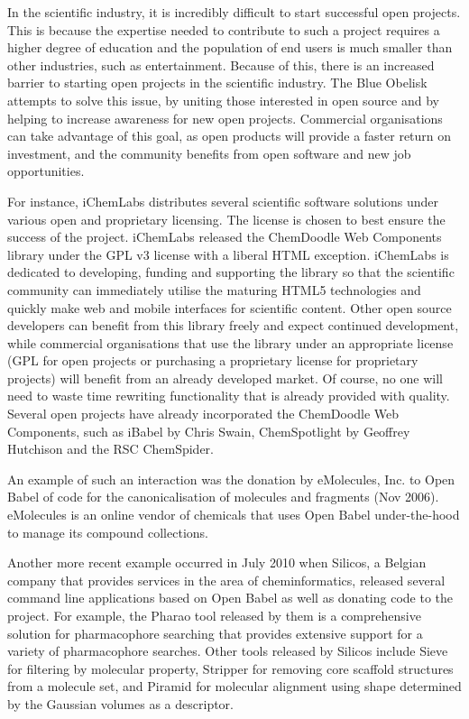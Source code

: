 \documentclass[10pt]{bmc_article}
\newenvironment{bmcformat}{\fussy\setboolean{publ}{true}}{\fussy}
\begin{document}
\begin{bmcformat}
In the scientific industry, it is incredibly difficult to start successful open projects. This is because the expertise needed to contribute to such a project requires a higher degree of education and the population of end users is much smaller than other industries, such as entertainment. Because of this, there is an increased barrier to starting open projects in the scientific industry. The Blue Obelisk attempts to solve this issue, by uniting those interested in open source and by helping to increase awareness for new open projects. Commercial organisations can take advantage of this goal, as open products will provide a faster return on investment, and the community benefits from open software and new job opportunities.

For instance, iChemLabs distributes several scientific software solutions under various open and proprietary licensing. The license is chosen to best ensure the success of the project. iChemLabs released the ChemDoodle Web Components library under the GPL v3 license with a liberal HTML exception. iChemLabs is dedicated to developing, funding and supporting the library so that the scientific community can immediately utilise the maturing HTML5 technologies and quickly make web and mobile interfaces for scientific content. Other open source developers can benefit from this library freely and expect continued development, while commercial organisations that use the library under an appropriate license (GPL for open projects or purchasing a proprietary license for proprietary projects) will benefit from an already developed market. Of course, no one will need to waste time rewriting functionality that is already provided with quality. Several open projects have already incorporated the ChemDoodle Web Components, such as iBabel by Chris Swain\cite{iBabel}, ChemSpotlight by Geoffrey Hutchison\cite{chemspotlight} and the RSC ChemSpider\cite{chemspider_chemdoodle}.

An example of such an interaction was the donation by eMolecules, Inc.
to Open Babel of code for the canonicalisation of molecules and
fragments (Nov 2006). eMolecules is an online vendor of chemicals that
uses Open Babel under-the-hood to manage its compound collections.

Another more recent example occurred in July 2010 when Silicos, a
Belgian company that provides services
in the area of cheminformatics, released several command line
applications based on Open Babel as well as donating code to the
project. For example, the Pharao
tool released by them is a comprehensive solution for pharmacophore
searching that provides extensive support for a variety of
pharmacophore searches. Other tools released by Silicos include Sieve for
filtering by molecular property, Stripper for removing core scaffold
structures from a molecule set, and Piramid for molecular alignment
using shape determined by the Gaussian volumes as a descriptor.


\end{bmcformat}
\end{document}
